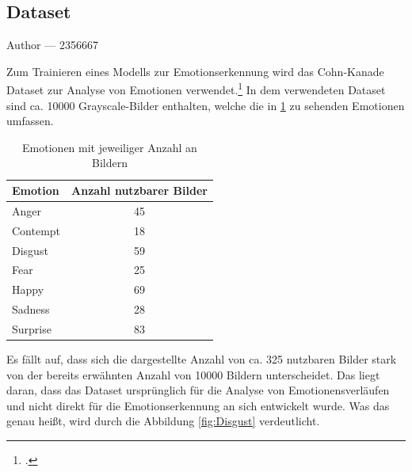 \documentclass[12pt, a4paper]{report}
\makeatletter
\newcommand{\sectionauthor}[1]{%
  {\parindent0pt\vspace*{-5pt}%
  \large{Author --- }
  \linespread{1.1}\large\scshape#1%
  \par\nobreak\vspace*{35pt} }
  \@afterheading%
}
\makeatother
\begin{document}
\subsection{Dataset}
\sectionauthor{2356667}
Zum Trainieren eines Modells zur Emotionserkennung wird das Cohn-Kanade Dataset zur Analyse von Emotionen verwendet.\footcite[Vgl.][]{CK} In dem verwendeten Dataset sind ca. 10000 Grayscale-Bilder enthalten, welche die in \ref{tab:ckemotions} zu sehenden Emotionen umfassen.
\begin{table}[h]
\centering
\begin{tabular}[t]{l|c}
Emotion & Anzahl nutzbarer Bilder \\
\hline
Anger & 45 \\
Contempt & 18 \\
Disgust & 59 \\
Fear & 25 \\
Happy & 69 \\
Sadness & 28 \\
Surprise & 83 \\
\hline
\end{tabular}
\caption{Emotionen mit jeweiliger Anzahl an Bildern}
\label{tab:ckemotions}
\end{table}
Es fällt auf, dass sich die dargestellte Anzahl von ca. 325 nutzbaren Bilder stark von der bereits erwähnten Anzahl von 10000 Bildern unterscheidet. Das liegt daran, dass das Dataset ursprünglich für die Analyse von Emotionensverläufen und nicht direkt für die Emotionserkennung an sich entwickelt wurde. Was das genau heißt, wird durch die Abbildung \ref{fig:Disgust} verdeutlicht.
\end{document}
